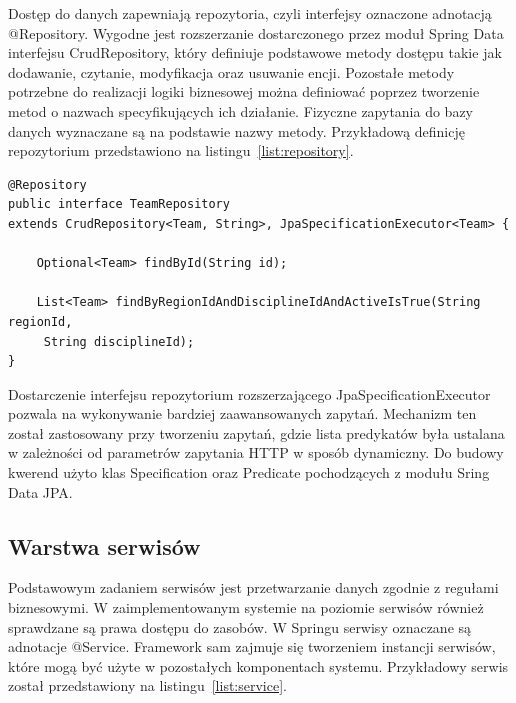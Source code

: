 Dostęp do danych zapewniają repozytoria, czyli interfejsy oznaczone adnotacją @Repository. Wygodne jest rozszerzanie dostarczonego przez moduł Spring Data interfejsu CrudRepository, który definiuje podstawowe metody dostępu takie jak dodawanie, czytanie, modyfikacja oraz usuwanie encji. Pozostałe metody potrzebne do realizacji logiki biznesowej można definiować poprzez tworzenie metod o nazwach specyfikujących ich działanie. Fizyczne zapytania do bazy danych wyznaczane są na podstawie nazwy metody. Przykładową definicję repozytorium przedstawiono na listingu~\ref{list:repository}.

\begin{lstlisting}[label=list:repository, caption=Definicja przykładowego repozytorium, basicstyle=\footnotesize\ttfamily]
@Repository
public interface TeamRepository 
extends CrudRepository<Team, String>, JpaSpecificationExecutor<Team> {

    Optional<Team> findById(String id);

    List<Team> findByRegionIdAndDisciplineIdAndActiveIsTrue(String regionId,
     String disciplineId);
}
\end{lstlisting}

Dostarczenie interfejsu repozytorium rozszerzającego JpaSpecificationExecutor pozwala na wykonywanie bardziej zaawansowanych zapytań. Mechanizm ten został zastosowany przy tworzeniu zapytań, gdzie lista predykatów była ustalana w zależności od parametrów zapytania HTTP w sposób dynamiczny. Do budowy kwerend użyto klas Specification oraz Predicate pochodzących z modułu Sring Data JPA.


\subsection{Warstwa serwisów}

Podstawowym zadaniem serwisów jest przetwarzanie danych zgodnie z regułami biznesowymi. W zaimplementowanym systemie na poziomie serwisów również sprawdzane są prawa dostępu do zasobów. W Springu serwisy oznaczane są adnotacje @Service. Framework sam zajmuje się tworzeniem instancji serwisów, które mogą być użyte w pozostałych komponentach systemu. Przykładowy serwis został przedstawiony na listingu~\ref{list:service}.

